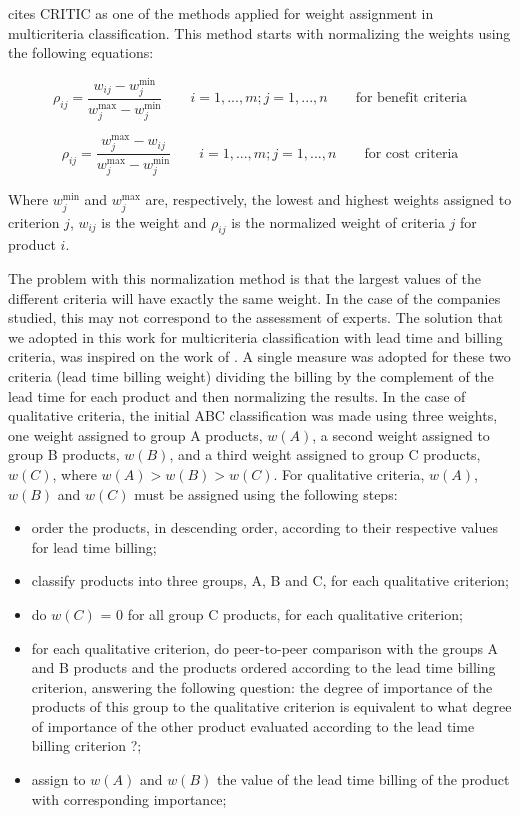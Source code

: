 \documentclass[10pt,fleqn,a4paper,twoside]{article}
\begin{document}
	\citet{Odu2019} cites CRITIC as one of the methods applied for weight assignment in multicriteria classification. This method starts with normalizing the weights using the following equations:
	
	\begin{equation}
		\rho_{ij} = \frac{w_{ij} - w_{j}^{\min}}{w_{j}^{\max} - w_{j}^{\min}} \qquad i=1,...,m; j = 1, ..., n \qquad \textrm{for benefit criteria}
	\end{equation}
	
	\begin{equation}
		\rho_{ij} = \frac{w_{j}^{\max} - w_{ij}}{w_{j}^{\max} - w_{j}^{\min}} \qquad i=1,...,m; j = 1, ..., n \qquad \textrm{for cost criteria}
	\end{equation}
	
	Where $w_{j}^{\min}$ and $w_{j}^{\max}$ are, respectively, the lowest and highest weights assigned to criterion $j$, $w_{ij}$ is the weight and $\rho_{ij}$ is the normalized weight of criteria $j$ for product $i$. 
	 
	The problem with this normalization method is that the largest values of the different criteria will have exactly the same weight. In the case of the companies studied, this may not correspond to the assessment of experts. The solution that we adopted in this work for multicriteria classification with lead time and billing criteria, was inspired on the work of \cite{Williams1984}. A single measure was adopted for these two criteria (lead time billing  weight) dividing the billing by the complement of the lead time for each product and then normalizing the results. In the case of qualitative criteria, the initial ABC classification was made using three weights, one weight assigned to group A products, $w(A)$, a second weight assigned to group B products, $w(B)$, and a third weight assigned to group C products, $w(C)$, where $w(A) > w(B) > w(C)$. For qualitative criteria, $w(A)$, $w(B)$ and $w(C)$ must be assigned using the following steps:
	
\begin{itemize}
\item order the products, in descending order, according to their respective values for lead time billing;
\item classify products into three groups, A, B and C, for each qualitative criterion;
\item do $w(C)$ = 0 for all group C products, for each qualitative criterion;
\item for each qualitative criterion, do peer-to-peer comparison with the groups A and B products and the products ordered according to the lead time billing criterion, answering the following question: the degree of importance of the products of this group to the qualitative criterion is equivalent to what degree of importance of the other product evaluated according to the lead time billing criterion ?;
\item assign to $w(A)$ and $w(B)$ the value of the lead time billing of the product with corresponding importance; 
\end{itemize}	
\end{document}
